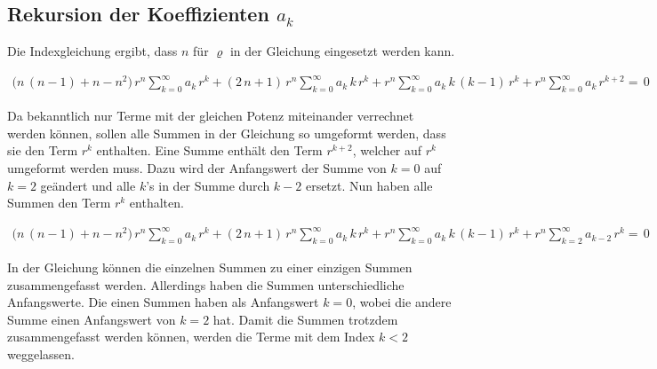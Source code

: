 \subsection{Rekursion der Koeffizienten $a_k$}
\begin{normalsize}
Die Indexgleichung ergibt, dass $n$ f\"ur $\varrho$ in der Gleichung  eingesetzt werden kann.
\end{normalsize}
\begin{align}
	\biggl(
	n \, \left( n - 1 \right)
	+
	n
	-
	n^2
	\biggr)
	\, r^{n}
	\sum_{k=0}^{\infty} a_k \, r^k
	+
	\left(	
	2 \, n
	+
	1
	\right)
	\, r^{n}
	\sum_{k=0}^{\infty} a_k \, k \, r^k
	+
	r^{n}
	\sum_{k=0}^{\infty} a_k \, k \, \left( k - 1 \right) \, r^k
	+
	r^{n}
	\sum_{k=0}^{\infty} a_k \, r^{k + 2}
	= \, 0
	\label{eq:bessel:potenzreihe:dgl:index:eingesetzt}
\end{align}
\begin{normalsize}
Da bekanntlich nur Terme mit der gleichen Potenz miteinander verrechnet werden k\"onnen,
sollen alle Summen in der Gleichung  so umgeformt werden,
dass sie den Term $r^k$ enthalten.
Eine Summe enth\"alt den Term $r^{k + 2}$,
welcher auf $r^k$ umgeformt werden muss.
Dazu wird der Anfangswert der Summe von $k = 0$ auf $k = 2$ ge\"andert und alle $k$'s in der Summe durch $k - 2$ ersetzt.
Nun haben alle Summen den Term $r^k$ enthalten.
\end{normalsize}
\begin{align}
	\biggl(
	n \, \left( n - 1 \right)
	+
	n
	-
	n^2
	\biggr)
	\, r^{n}
	\sum_{k=0}^{\infty} a_k \, r^k
	+
	\left(	
	2 \, n
	+
	1
	\right)
	\, r^{n}
	\sum_{k=0}^{\infty} a_k \, k \, r^k
	+
	r^{n}
	\sum_{k=0}^{\infty} a_k \, k \, \left( k - 1 \right) \, r^k
	+
	r^{n}
	\sum_{k=2}^{\infty} a_{k - 2} \, r^k
	= \, 0
	\label{eq:bessel:potenzreihe:dgl:index:eingesetzt:gleichesummen}
\end{align}
\begin{normalsize}
In der Gleichung  k\"onnen die einzelnen Summen zu einer einzigen Summen zusammengefasst werden.
Allerdings haben die Summen unterschiedliche Anfangswerte.
Die einen Summen haben als Anfangswert $k = 0$,
wobei die andere Summe einen Anfangswert von $k = 2$ hat.
Damit die Summen trotzdem zusammengefasst werden k\"onnen,
werden die Terme mit dem Index $k < 2$ weggelassen.
\end{normalsize}
